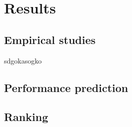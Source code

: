 \chapter{Results}

\section{Empirical studies}
sdgokasogko

\section{Performance prediction}

\section{Ranking}